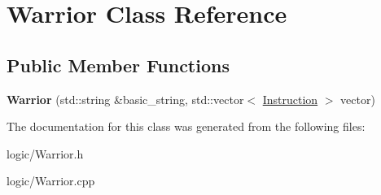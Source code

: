 \hypertarget{classWarrior}{}\section{Warrior Class Reference}
\label{classWarrior}
\subsection*{Public Member Functions}
\begin{DoxyCompactItemize}
\item 
\mbox{\label{classWarrior_a46571f6d88e44793728ac68fa372fdff}} 
{\bfseries Warrior} (std\+::string \&basic\+\_\+string, std\+::vector$<$ \hyperlink{classInstruction}{Instruction} $>$ vector)
\end{DoxyCompactItemize}


The documentation for this class was generated from the following files\+:\begin{DoxyCompactItemize}
\item 
logic/Warrior.\+h\item 
logic/Warrior.\+cpp\end{DoxyCompactItemize}
